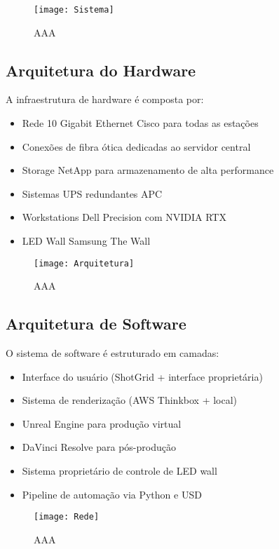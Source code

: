 \begin{figure}[ht]
    \centering
    \texttt{[image: Sistema]}
    \caption{AAA}
    \label{fig:data}
\end{figure}

\subsection{Arquitetura do Hardware}
A infraestrutura de hardware é composta por:
\begin{itemize}
    \item Rede 10 Gigabit Ethernet Cisco para todas as estações
    \item Conexões de fibra ótica dedicadas ao servidor central
    \item Storage NetApp para armazenamento de alta performance
    \item Sistemas UPS redundantes APC
    \item Workstations Dell Precision com NVIDIA RTX
    \item LED Wall Samsung The Wall
\end{itemize}

\begin{figure}[ht]
    \centering
    \texttt{[image: Arquitetura]}
    \caption{AAA}
    \label{fig:data}
\end{figure}

\pagebreak
\newpage

\subsection{Arquitetura de Software}
O sistema de software é estruturado em camadas:
\begin{itemize}
    \item Interface do usuário (ShotGrid + interface proprietária)
    \item Sistema de renderização (AWS Thinkbox + local)
    \item Unreal Engine para produção virtual
    \item DaVinci Resolve para pós-produção
    \item Sistema proprietário de controle de LED wall
    \item Pipeline de automação via Python e USD
\end{itemize}

\begin{figure}[ht]
    \centering
    \texttt{[image: Rede]}
    \caption{AAA}
    \label{fig:data}
\end{figure}
